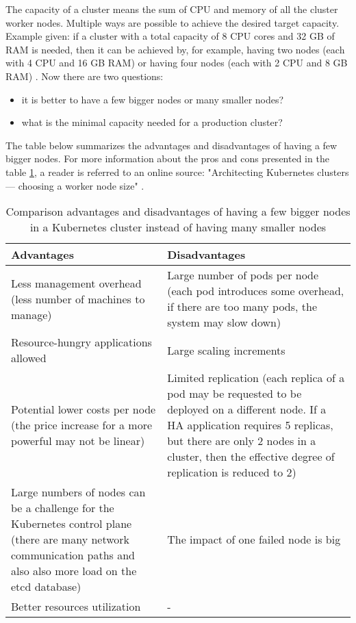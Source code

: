 The capacity of a cluster means the sum of CPU and memory of all the cluster worker nodes. Multiple ways are possible to achieve the desired target capacity. Example given: if a cluster with a total capacity of 8 CPU cores and 32 GB of RAM is needed, then it can be achieved by, for example, having two nodes (each with 4 CPU and 16 GB RAM) or having four nodes (each with 2 CPU and 8 GB RAM) \cite{kubernetes-node-size}. Now there are two questions:
\begin{itemize}
\item it is better to have a few bigger nodes or many smaller nodes?
\item what is the minimal capacity needed for a production cluster?
\end{itemize}

The table below summarizes the advantages and disadvantages of having a few bigger nodes. For more information about the pros and cons presented in the table \ref{tab:pros-cons-large-nodes}, a reader is referred to an online source: "Architecting Kubernetes clusters — choosing a worker node size" \cite{kubernetes-node-size}.

\begin{table}[H]
\begin{tabularx}{1\textwidth} {
  | >{\centering\arraybackslash}X
  | >{\centering\arraybackslash}X | }
 \hline
  \textbf{Advantages} & \textbf{Disadvantages}  \\
 \hline
 Less management overhead (less number of machines to manage)  & Large number of pods per node (each pod introduces some overhead, if there are too many pods, the system may slow down)   \\
 \hline
 Resource-hungry applications allowed  & Large scaling increments  \\
 \hline
  Potential lower costs per node (the price increase for a more powerful may not be linear)  & Limited replication (each replica of a pod may be requested to be deployed on a different node. If a HA application requires 5 replicas, but there are only 2 nodes in a cluster, then the effective degree of replication is reduced to 2)  \\
 \hline
  Large numbers of nodes can be a challenge for the Kubernetes control plane (there are many network communication paths and also also more load on the etcd database) & The impact of one failed node is big   \\
 \hline
  Better resources utilization & -  \\
 \hline
\end{tabularx}
\caption{\label{tab:pros-cons-large-nodes}Comparison advantages and disadvantages of having a few bigger nodes in a Kubernetes cluster instead of having many smaller nodes \cite{kubernetes-node-size}}
\end{table}


